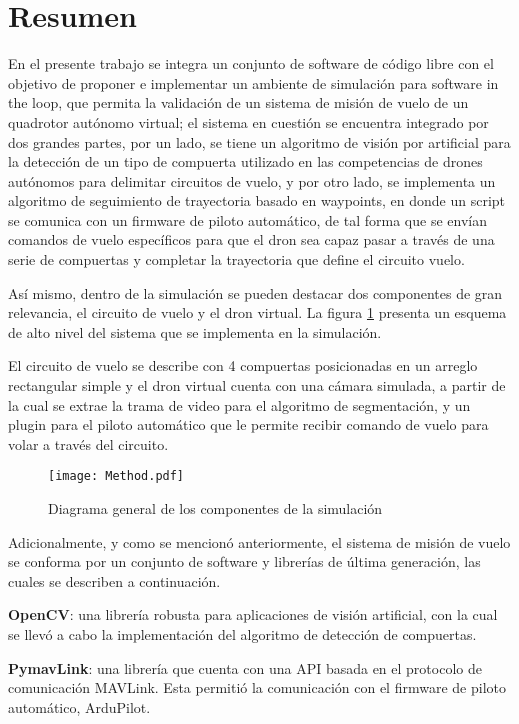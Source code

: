 \chapter*{Resumen}
En el presente trabajo se integra un conjunto de software de código libre con el objetivo de proponer e implementar un ambiente de simulación para software in the loop, que permita la validación de un sistema de misión de vuelo de un quadrotor autónomo virtual; el sistema en cuestión se encuentra integrado por dos grandes partes, por un lado, se tiene un algoritmo de visión por artificial para la detección de un tipo de compuerta utilizado en las competencias de drones autónomos para delimitar circuitos de vuelo, y por otro lado, se implementa un algoritmo de seguimiento de trayectoria basado en waypoints, en donde un script se comunica con un firmware de piloto automático, de tal forma que se envían comandos de vuelo específicos para que el dron sea capaz pasar a través de una serie de compuertas y completar la trayectoria que define el circuito vuelo.

Así mismo, dentro de la simulación se pueden destacar dos componentes de gran relevancia, el circuito de vuelo y el dron virtual. La figura \ref{fig:method} presenta un esquema de alto nivel del sistema que se implementa en la simulación. 

El circuito de vuelo se describe con 4 compuertas posicionadas en un arreglo rectangular simple y el dron virtual cuenta con una cámara simulada, a partir de la cual se extrae la trama de video para el algoritmo de segmentación, y un plugin para el piloto automático que le permite recibir comando de vuelo para volar a través del circuito.

\begin{figure}[ht]
    \centering
    \texttt{[image: Method.pdf]}
    \caption{Diagrama general de los componentes de la simulación}
    \label{fig:method}
\end{figure}

Adicionalmente, y como se mencionó anteriormente, el sistema de misión de vuelo se conforma por un conjunto de software y librerías de última generación, las cuales se describen a continuación.

\textbf{OpenCV}: una librería robusta para aplicaciones de visión artificial, con la cual se llevó a cabo la implementación del algoritmo de detección de compuertas.

\textbf{PymavLink}: una librería que cuenta con una API basada en el protocolo de comunicación MAVLink. Esta permitió la comunicación con el firmware de piloto automático, ArduPilot.

